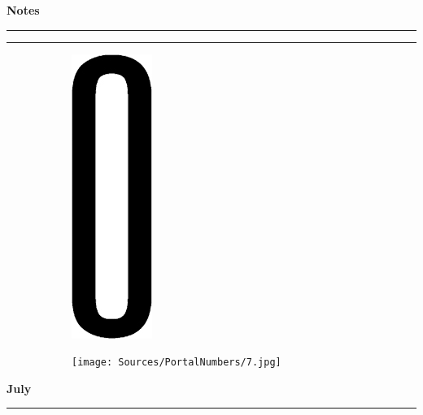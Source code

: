 \newpage
\begin{notesbox}
\textbf{Notes} \\
\rule{\linewidth}{0.02cm}
\end{notesbox}


\newpage
\rule{\linewidth}{0.1cm} \par
\begin{figure}[H]
  \begin{subfigure}[l]{0.15\textwidth}
    \includegraphics[height=0.35\textheight]{Sources/PortalNumbers/0.jpg}
  \end{subfigure}
  \hspace{0.3cm}
  \begin{subfigure}[l]{0.5\textwidth}
    \texttt{[image: Sources/PortalNumbers/7.jpg]}
  \end{subfigure}
  
\end{figure}

 \hfill \sffamily\textbf{\fontsize{16}{20}\selectfont July} \par
\rule{\linewidth}{0.1cm} \par

